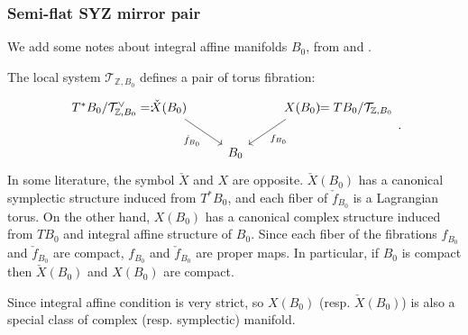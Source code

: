 \documentclass[a4paper,dvipdfmx,reqno,12pt]{amsart}
\theoremstyle{definition}
\newcommand{\deq}{\coloneqq}
\newcommand{\Z}{\mathbb{Z}}%
\numberwithin{equation}{section}
\begin{document}
\subsubsection{Semi-flat SYZ mirror pair}

We add some notes about integral affine manifolds $B_0$,
from \cite[Chapter 6]{MR2567952} and \cite{sepethesis}.

The local system $\mathcal{T}_{\mathbb{Z}, B_0}$ defines 
 a pair of torus fibration:
\begin{equation} \label{definition-SYZ-torus-fibration}
\begin{tikzcd}%
T^{*}B_0/\mathcal{T}_{\Z , B_0}^{\vee} =:\hspace{-35pt} 
&\check{X}(B_0) \arrow[rd,"\check{f}_{B_0}"'] 
&   & X(B_0) \arrow[ld,"f_{B_0}"] 
&\hspace{-35pt} \deq TB_0/\mathcal{T}_{\Z, B_0} \\
& &  B_0 & &
\end{tikzcd}.
\end{equation}
In some literature, the symbol $\check{X}$ and
$X$ are opposite. 
$\check{X}(B_0)$ has a canonical symplectic structure 
induced from $T^{*}B_0$, and each fiber of 
$\check{f}_{B_0}$ is a Lagrangian torus.
On the other hand, $X(B_0)$ has a canonical complex
structure induced from $TB_0$ and integral affine 
structure of $B_0$.
Since each fiber of the fibrations $f_{B_0}$ and 
$\check{f}_{B_0}$ are compact,
$f_{B_0}$ and $\check{f}_{B_0}$ are proper maps.
In particular, if $B_0$ is compact then 
$\check{X}(B_0)$ and $X(B_0)$ are compact.

Since integral affine condition is very strict, so 
$X(B_0)$ (resp. $\check{X}(B_0)$) is also a special class of complex (resp. symplectic) manifold.
\end{document}
